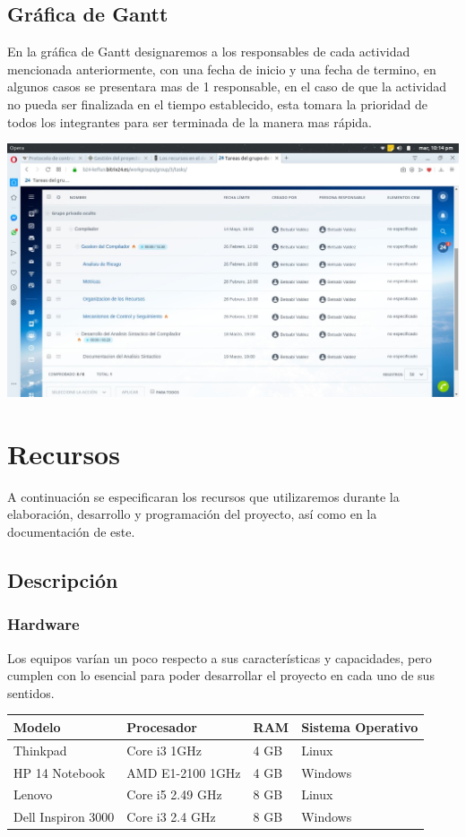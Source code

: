 \documentclass[10pt,executivepaper]{article}
\begin{document}
\subsection{Gráfica de Gantt}
En la gráfica de Gantt designaremos a los responsables de cada actividad mencionada anteriormente, con una fecha de inicio y una fecha de termino, en algunos casos se presentara mas de 1 responsable, en el caso de que la actividad no pueda ser finalizada en el tiempo establecido, esta tomara la prioridad de todos los integrantes para ser terminada de la manera mas rápida.
\begin{flushright}
\includegraphics[scale=0.3]{imgs/anexoGantt.jpeg}
\end{flushright}

\section{Recursos}
A continuación se especificaran los recursos que utilizaremos durante la elaboración, desarrollo y programación del proyecto, así como en la documentación de este.
\subsection{Descripción}
\subsubsection{Hardware}
Los equipos varían un poco respecto a sus características y capacidades, pero cumplen con lo esencial para poder desarrollar el proyecto en cada uno de sus sentidos.

\begin{tabular}{|p{3cm}|p{3cm}|p{3cm}|p{3cm}|}
\hline
Modelo & Procesador & RAM & Sistema Operativo  \\\hline
Thinkpad & Core i3 1GHz & 4 GB & Linux  \\\hline
HP 14 Notebook & AMD E1-2100 1GHz & 4 GB & Windows  \\\hline
Lenovo & Core i5 2.49 GHz & 8 GB & Linux  \\\hline
Dell Inspiron 3000 & Core i3 2.4 GHz & 8 GB & Windows  \\\hline
\end{tabular}
\end{document}
